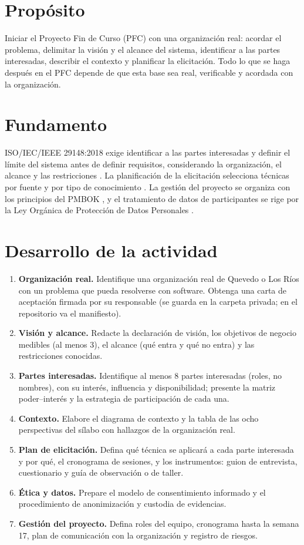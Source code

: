 \documentclass[11pt]{article}
\newcommand{\seccion}[1]{\section{\textcolor{utegreendk}{#1}}}
\begin{document}
\seccion{Propósito}

Iniciar el Proyecto Fin de Curso (PFC) con una organización real: acordar el problema, delimitar la visión y el alcance del sistema, identificar a las partes interesadas, describir el contexto y planificar la elicitación. Todo lo que se haga después en el PFC depende de que esta base sea real, verificable y acordada con la organización.

\seccion{Fundamento}

ISO/\allowbreak{}IEC/\allowbreak{}IEEE 29148:2018 exige identificar a las partes interesadas y definir el límite del sistema antes de definir requisitos, considerando la organización, el alcance y las restricciones \citep{iso29148_2018}. La planificación de la elicitación selecciona técnicas por fuente y por tipo de conocimiento \citep{pohl_2025,ireb_cpre_fl_2026}. La gestión del proyecto se organiza con los principios del PMBOK \citep{pmbok_2021}, y el tratamiento de datos de participantes se rige por la Ley Orgánica de Protección de Datos Personales \citep{lopdp_2021,reglamento_lopdp_2023}.

\seccion{Desarrollo de la actividad}

\begin{enumerate}[leftmargin=20pt,itemsep=4pt]
	\item \textbf{Organización real.} Identifique una organización real de Quevedo o Los Ríos con un problema que pueda resolverse con software. Obtenga una carta de aceptación firmada por su responsable (se guarda en la carpeta privada; en el repositorio va el manifiesto).
	\item \textbf{Visión y alcance.} Redacte la declaración de visión, los objetivos de negocio medibles (al menos 3), el alcance (qué entra y qué no entra) y las restricciones conocidas.
	\item \textbf{Partes interesadas.} Identifique al menos 8 partes interesadas (roles, no nombres), con su interés, influencia y disponibilidad; presente la matriz poder–interés y la estrategia de participación de cada una.
	\item \textbf{Contexto.} Elabore el diagrama de contexto y la tabla de las ocho perspectivas del sílabo con hallazgos de la organización real.
	\item \textbf{Plan de elicitación.} Defina qué técnica se aplicará a cada parte interesada y por qué, el cronograma de sesiones, y los instrumentos: guion de entrevista, cuestionario y guía de observación o de taller.
	\item \textbf{Ética y datos.} Prepare el modelo de consentimiento informado y el procedimiento de anonimización y custodia de evidencias.
	\item \textbf{Gestión del proyecto.} Defina roles del equipo, cronograma hasta la semana 17, plan de comunicación con la organización y registro de riesgos.
\end{enumerate}
\end{document}
